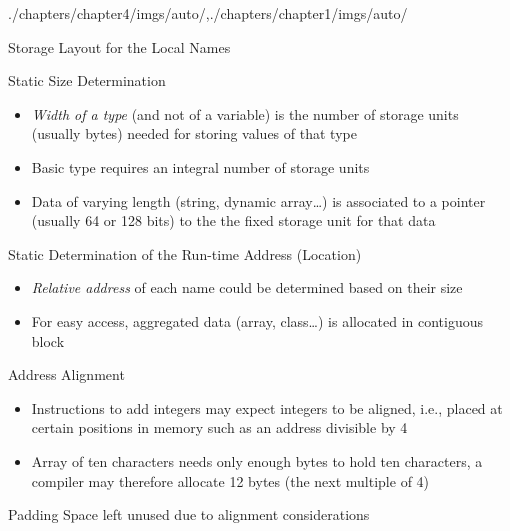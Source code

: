 \begin{graphicspathcontext}{{./chapters/chapter4/imgs/auto/},{./chapters/chapter1/imgs/auto/}}
\begin{bibunit}[apalike]
\begin{frame}{{Storage Layout} for the Local Names}
	\begin{footnotesize}
		\begin{block}{Static Size Determination}
			\begin{itemize}
				\item \emph{Width of a type} (and not of a variable) is the number of storage units (usually bytes) needed for storing values of that type
				\item Basic type requires an integral number of storage units
				\item Data of varying length (string, dynamic array\dots) is associated to a pointer (usually 64 or 128 bits) to the the fixed storage unit for that data
			\end{itemize}
		\end{block}
		\begin{block}{Static Determination of the Run-time Address (Location)}
			\begin{itemize}
				\item \emph{Relative address} of each name could be determined based on their size
				\item For easy access, aggregated data (array, class\dots) is allocated in contiguous block
			\end{itemize}
		\end{block}
	\end{footnotesize}
\end{frame}

\begin{frame}[t]{Address Alignment}
	\begin{small}
		\begin{examples}
			\begin{itemize}
			\item Instructions to add integers may expect integers to be aligned, i.e., placed at certain positions in memory such as an address divisible by 4
			\item Array of ten characters needs only enough bytes to hold ten characters, a compiler may therefore allocate 12 bytes (the next multiple of 4)
			\end{itemize}
		\end{examples}
		\begin{definitionblock}{Padding}
			Space left unused due to alignment considerations
		\end{definitionblock}
	\end{small}
\end{frame}


\end{bibunit}
\end{graphicspathcontext}
